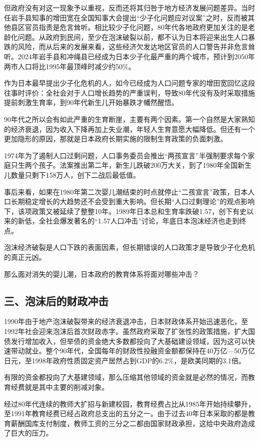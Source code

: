 但政府没有对这一现象予以重视，反而还将其归咎于地方经济发展问题差异。当时任岩手县知事的增田宽在全国知事大会提出“少子化问题应对议案”之时，反而被其他县区官员指责是危言耸听。相比较少子化问题，80年代各地政府更加关注的是老龄化问题。从政府到民间，至少在泡沫破裂以前，都不认为日本将迎来出生人口暴跌的风险，而从后来的发展来看，这些经济欠发达地区官员的人口警告并非危言耸听。2024年岩手县和冲绳县已经成为日本少子化最严重的两个城市，预计到2050年两市人口将比1995年最顶峰时减少约50\%。

作为日本最早提出少子化危机的人，如今已经成为人口问题专家的增田宽回忆这段往事时评价：全社会对于人口增长趋势的严重误判，导致80年代没有及时采取措施提前刺激生育率，到90年代新生儿开始暴跌才幡然醒悟。

90年代之所以会有如此严重的生育断崖，主要有两个因素。第一个自然是大家熟知的经济衰退，因为收入下降再加上失业潮，年轻人生育意愿大幅降低。但还有一个更加隐形的原因，那就是日本政府长期实施的限制生育政策的负面刺激。

1974年为了遏制人口过剩问题，人口事务委员会推出“两孩宣言”半强制要求每个家庭只生两个孩子。法案推出第二年，新生儿跌破200万大关，到了1980年全国新生儿数量只剩下158万人，创下二战后最低值。

事后来看，如果在1980年第二次婴儿潮结束的时点就停止“二孩宣言”政策，日本人口长期稳定增长的大趋势还不会受到重大影响。但长期“人口过剩理论”的观点影响下，该项政策又被延续了整整10年。1989年日本总和生育率跌破1.57，创下有史以来的新低，全社会爆发著名的“1.57人口冲击”讨论，年底日本泡沫经济也走到终点。

泡沫经济破裂是人口下跌的表面因素，但长期错误的人口政策才是导致少子化危机的真正元凶。

那么面对消失的婴儿潮，日本政府的教育体系将面对哪些冲击？

\subsection{三、泡沫后的财政冲击}

1990年由于地产泡沫破裂带来的经济衰退冲击，日本财政体系开始迅速恶化，至1992年社会迎来泡沫后首次财政赤字。虽然政府采取了扩张性的政策措施，扩大国债发行增加收入，但举债的资金绝大多数都投向了大基础建设领域，因为这可以快速带动就业。整个90年代，全国每年的财政性投融资金额都保持在40万亿—50万亿日元，至1998年政府性质固定资产居然占到GDP的6.2\%，是欧美同期的3.1倍。

有限的资金都投向了大基建领域，那么压缩其他领域的资金就是必然的情况，而教育经费就是其中主要的削减对象。

经过80年代连续的教师大扩招与新建校园，教育经费占比从1985年开始持续攀升，至1991年教育经费已经占政府总支出的五分之一。由于过去40年日本采取的都是教育薪酬国库支付制度，教师工资的三分之二都由国家财政承担，这给中央政府造成了巨大的压力。

